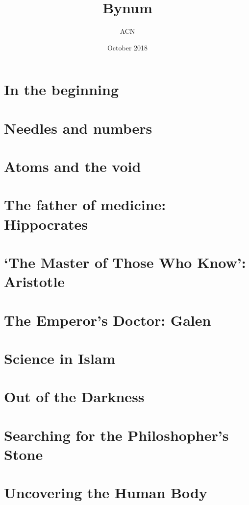 \documentclass[a4paper,12pt]{article}
\title{Bynum}
\author{ACN}
\date{October 2018}
\begin{document}
\maketitle

\section{In the beginning} %

\section{Needles and numbers} %

\section{Atoms and the void} %

\section{The father of medicine: Hippocrates} %

\section{`The Master of Those Who Know': Aristotle} %

\section{The Emperor's Doctor: Galen} %

\section{Science in Islam} %
	
\section{Out of the Darkness} %

\section{Searching for the Philoshopher's Stone} %

\section{Uncovering the Human Body} %
\end{document}
